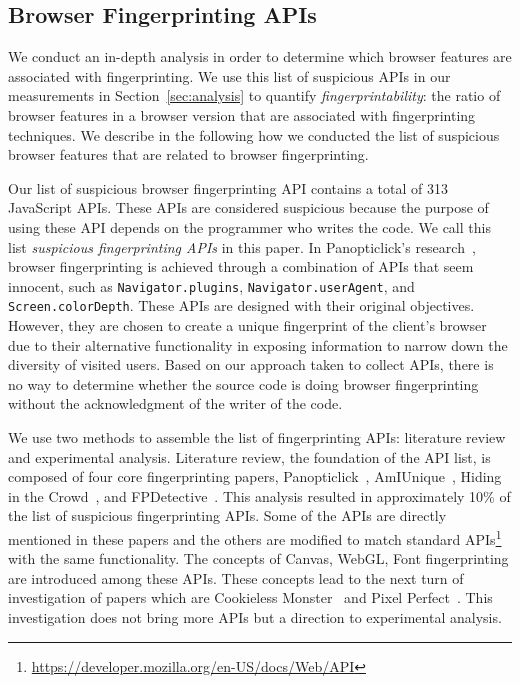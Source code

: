 \subsection{Browser Fingerprinting APIs}
\label{sec:fp-apis}

We conduct an in-depth analysis in order to determine which browser features are associated with fingerprinting. We use this list of suspicious APIs in our measurements in Section~\ref{sec:analysis} to quantify \textit{fingerprintability}: the ratio of browser features in a browser version that are associated with fingerprinting techniques. We describe in the following how we conducted the list of suspicious browser features that are related to browser fingerprinting.

Our list of suspicious browser fingerprinting API contains a total of 313 JavaScript APIs. These APIs are considered suspicious because the purpose of using these API depends on the programmer who writes the code. 
We call this list \textit{suspicious fingerprinting APIs} in this paper.
In Panopticlick's research~\cite{panopticlick}, browser fingerprinting is achieved through a combination of APIs that seem innocent, such as \texttt{Navigator.plugins}, \texttt{Navigator.userAgent}, and \texttt{Screen.colorDepth}. These APIs are designed with their original objectives. However, they are chosen to create a unique fingerprint of the client's browser due to their alternative functionality in exposing information to narrow down the diversity of visited users. Based on our approach taken to collect APIs, there is no way to determine whether the source code is doing browser fingerprinting without the acknowledgment of the writer of the code. 

We use two methods to assemble the list of fingerprinting APIs: literature review and experimental analysis. Literature review, the foundation of the API list, is composed of four core fingerprinting papers, Panopticlick~\cite{panopticlick}, AmIUnique~\cite{amiunique}, Hiding in the Crowd~\cite{hidinginthecrowd}, and FPDetective~\cite{fpdetective}. This analysis resulted in approximately 10\% of the list of suspicious fingerprinting APIs. Some of the APIs are directly mentioned in these papers and the others are modified to match standard APIs\footnote{\url{https://developer.mozilla.org/en-US/docs/Web/API}} with the same functionality. The concepts of Canvas, WebGL, Font fingerprinting are introduced among these APIs. These concepts lead to the next turn of investigation of papers which are Cookieless Monster~\cite{cookiemonster-SP13} and Pixel Perfect~\cite{mowery2012pixel}. This investigation does not bring more APIs but a direction to experimental analysis. 

